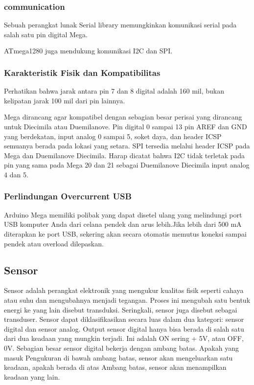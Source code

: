 \subsubsection{communication}

Sebuah perangkat lunak Serial library memungkinkan komunikasi serial pada salah satu pin digital Mega.

ATmega1280 juga mendukung komunikasi I2C dan SPI.

\subsubsection{Karakteristik Fisik dan Kompatibilitas}

Perhatikan bahwa jarak antara pin 7 dan 8 digital adalah 160 mil, bukan kelipatan jarak 100 mil dari pin lainnya.

Mega dirancang agar kompatibel dengan sebagian besar perisai yang dirancang untuk Diecimila atau Duemilanove. Pin digital 0 sampai 13 pin AREF dan GND yang berdekatan, input analog 0 sampai 5, soket daya, dan header ICSP semuanya berada pada lokasi yang setara. SPI tersedia melalui header ICSP pada Mega dan Duemilanove  Diecimila. Harap dicatat bahwa I2C tidak terletak pada pin yang sama pada Mega 20 dan 21 sebagai Duemilanove  Diecimila input analog 4 dan 5.

\subsubsection{Perlindungan Overcurrent USB}

Arduino Mega memiliki polibak yang dapat disetel ulang yang melindungi port USB komputer Anda dari celana pendek dan arus lebih.Jika lebih dari 500 mA diterapkan ke port USB, sekering akan secara otomatis memutus koneksi sampai pendek atau overload dilepaskan.
\subsection{Sensor}
Sensor adalah perangkat elektronik yang mengukur kualitas fisik seperti cahaya atau
suhu dan mengubahnya menjadi tegangan. Proses ini mengubah satu bentuk energi
ke yang lain disebut transduksi. Seringkali, sensor juga disebut sebagai transduser.
Sensor dapat diklasifikasikan secara luas dalam dua kategori: sensor digital dan sensor analog.
Output sensor digital hanya bisa berada di salah satu dari dua keadaan yang mungkin terjadi. Ini adalah ON
sering + 5V, atau OFF, 0V. Sebagian besar sensor digital bekerja dengan ambang batas. Apakah yang masuk
Pengukuran di bawah ambang batas, sensor akan mengeluarkan satu keadaan, apakah berada di atas
Ambang batas, sensor akan menampilkan keadaan yang lain.

